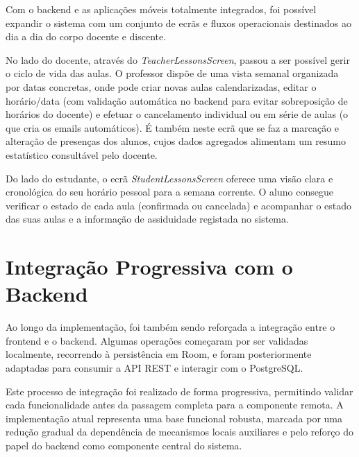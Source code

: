 Com o backend e as aplicações móveis totalmente integrados, foi possível expandir o sistema com um conjunto de ecrãs e fluxos operacionais destinados ao dia a dia do corpo docente e discente.

No lado do docente, através do \textit{TeacherLessonsScreen}, passou a ser possível gerir o ciclo de vida das aulas. O professor dispõe de uma vista semanal organizada por datas concretas, onde pode criar novas aulas calendarizadas, editar o horário/data (com validação automática no backend para evitar sobreposição de horários do docente) e efetuar o cancelamento individual ou em série de aulas (o que cria os emails automáticos). É também neste ecrã que se faz a marcação e alteração de presenças dos alunos, cujos dados agregados alimentam um resumo estatístico consultável pelo docente.

Do lado do estudante, o ecrã \textit{StudentLessonsScreen} oferece uma visão clara e cronológica do seu horário pessoal para a semana corrente. O aluno consegue verificar o estado de cada aula (confirmada ou cancelada) e acompanhar o estado das suas aulas e a informação de assiduidade registada no sistema.

\section{Integração Progressiva com o Backend}

Ao longo da implementação, foi também sendo reforçada a integração entre o frontend e o backend.
Algumas operações começaram por ser validadas localmente, recorrendo à persistência em Room, e foram posteriormente adaptadas para consumir
a API REST e interagir com o PostgreSQL.

Este processo de integração foi realizado de forma progressiva, permitindo validar cada funcionalidade antes da passagem completa para a componente remota.
A implementação atual representa uma base funcional robusta, marcada por uma redução gradual da dependência de mecanismos locais auxiliares e pelo reforço do papel do backend como componente central do sistema.